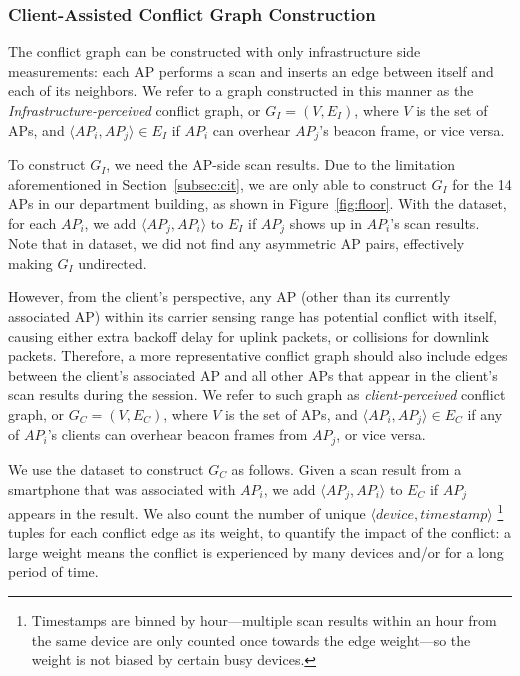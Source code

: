 \subsubsection{Client-Assisted Conflict Graph Construction}
\label{subsec:client_conflict}

The conflict graph can be constructed with only infrastructure side measurements:
each AP performs a \wifi{} scan and inserts an edge between itself and
each of its neighbors. We refer to a graph constructed in this manner as the
\textit{Infrastructure-perceived} conflict graph, or $G_I=(V, E_I)$, where $V$
is the set of APs, and $\langle AP_i, AP_j \rangle \in E_I$ if $AP_i$ can
overhear $AP_j$'s beacon frame, or vice versa. 

To construct $G_I$, we need the AP-side scan results. Due to the limitation
aforementioned in Section~\ref{subsec:cit}, we are only able to construct $G_I$
for the 14 APs in our department building, as shown in Figure~\ref{fig:floor}.
With the \ubapdetail{} dataset, for each $AP_i$, we add $\langle AP_j, AP_i \rangle$
to $E_I$ if $AP_j$ shows up in $AP_i$'s scan results. Note that in \ubapdetail{}
dataset, we did not find any asymmetric AP pairs, effectively making $G_I$ undirected.

However, from the \wifi{} client's perspective, any AP (other than its currently
associated AP) within its carrier sensing range has potential conflict with
itself, causing either extra backoff delay for uplink packets, or collisions for
downlink packets. Therefore, a more representative conflict graph should also
include edges between the client's associated AP and all other APs that appear
in the client's scan results during the \wifi{} session. We refer to such graph as
\textit{client-perceived} conflict graph, or $G_C=(V, E_C)$, where $V$ is the
set of APs, and $\langle AP_i, AP_j \rangle \in E_C$ if any of $AP_i$'s clients
can overhear beacon frames from $AP_j$, or vice versa.

We use the \ubscan{} dataset to construct $G_C$ as follows. Given a scan
result from a smartphone that was associated with $AP_i$, we add $\langle AP_j,
AP_i \rangle$ to $E_C$ if $AP_j$ appears in the result. We also count the number
of unique $\langle device, timestamp \rangle$%
\footnote{Timestamps are binned by hour---multiple scan results within an hour
from the same device are only counted once towards the edge weight---so the
weight is not  biased by certain busy devices.} %
tuples for each conflict edge as its weight, to quantify the impact of
the conflict: a large weight means the conflict is experienced by many
devices and/or for a long period of time.


